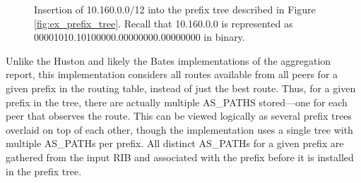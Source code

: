 \begin{figure}
    \caption[Insertion into the prefix tree]{Insertion of 10.160.0.0/12 into the prefix tree described in Figure \ref{fig:ex_prefix_tree}. Recall that 10.160.0.0 is represented as 00001010.10100000.00000000.00000000 in binary.}
    \label{fig:ex_prefix_tree_insert}
\end{figure}

Unlike the Huston and likely the Bates implementations of the aggregation report, this implementation considers all routes available from all peers for a given prefix in the routing table, instead of just the best route. Thus, for a given prefix in the tree, there are actually multiple AS\_PATHS stored---one for each peer that observes the route. This can be viewed logically as several prefix trees overlaid on top of each other, though the implementation uses a single tree with multiple AS\_PATHs per prefix. All distinct AS\_PATHs for a given prefix are gathered from the input RIB and associated with the prefix before it is installed in the prefix tree.

